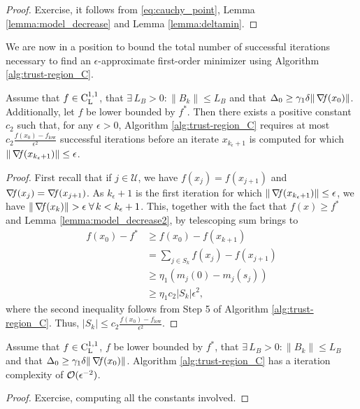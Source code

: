 \documentclass[10pt,a4paper]{article}
\begin{document}
\begin{proof}
	Exercise, it follows from \eqref{eq:cauchy_point}, Lemma \ref{lemma:model_decrease} and Lemma \ref{lemma:deltamin}.
\end{proof}

\noindent We are now in a position to bound the total number of successful iterations necessary to find an $\epsilon$-approximate first-order minimizer using Algorithm \ref{alg:trust-region_C}.

\begin{lemma}
	Assume that $f\in \mathord{\mathrm{C^{1,1}_{L}}}$, that $\exists\, L_B>0: \|B_k\| \leq L_B$ and that $\Delta_0\geq \gamma_1 \delta \|\operatorname*{\mathit{\nabla \!f}}(x_0)\|$. Additionally, let $f$ be lower bounded by $f^*$. Then there exists a positive constant $c_2$ such that, for any $\epsilon > 0$, Algorithm \ref{alg:trust-region_C} requires at most $c_2 \frac{f(x_0) - f_{\text{low}}}{\epsilon^2}$
	successful iterations before an iterate $x_{k_\epsilon+1}$ is computed for which $\|\operatorname*{\mathit{\nabla \!f}}(x_{k_\epsilon+1})\| \leq \epsilon$.
\end{lemma}
\begin{proof}
First recall that if $j\in \mathcal{U}$, we have $f(x_j) = f(x_{j+1})$ and $\operatorname*{\mathit{\nabla \!f}}(x_j)=\operatorname*{\mathit{\nabla \!f}}(x_{j+1})$. As $k_\epsilon+1$ is the first iteration for which $\|\operatorname*{\mathit{\nabla \!f}}(x_{k_\epsilon+1})\| \leq \epsilon$, we have $\|\grad(x_k)\|>\epsilon \; \forall \, k <k_\epsilon+1$. This, together with the fact that $f(x)\geq f^*$ and Lemma \ref{lemma:model_decrease2}, by telescoping sum brings to 
\begin{align*}
	f(x_0)-f^* &\geq f(x_0) - f(x_{k+1})\\
	& =\sum_{j\in S_k} f(x_j) - f(x_{j+1})\\
	& \geq \eta_1 (m_j(0)- m_j(s_j))\\
	& \geq \eta_1 c_2 |S_k| \epsilon^2,
\end{align*}
where the second inequality follows from Step 5 of Algorithm \ref{alg:trust-region_C}. Thus, $|S_k|\leq c_2 \frac{f(x_0) - f_{\text{low}}}{\epsilon^2}.$
\end{proof}

\begin{theorem}
	Assume that $f\in \mathord{\mathrm{C^{1,1}_{L}}}$, $f$ be lower bounded by $f^*$, that $\exists\, L_B>0: \|B_k\| \leq L_B$ and that $\Delta_0\geq \gamma_1 \delta \|\operatorname*{\mathit{\nabla \!f}}(x_0)\|$. Algorithm \ref{alg:trust-region_C} has a iteration complexity of $\mathcal{O}(\epsilon^{-2})$.
\end{theorem}
\begin{proof}
	Exercise, computing all the constants involved.
\end{proof}



\end{document}
